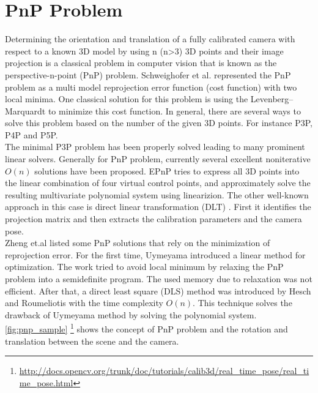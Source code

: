 \section{PnP Problem} \label{sec:PnP_problem}
Determining the orientation and translation of a fully calibrated camera with respect to a known 3D model by using n (n>3) 3D points and their image projection is a classical problem in computer vision that is known as the perspective-n-point (PnP) problem. Schweighofer et al. \cite{schweighofer2006robust} represented the PnP problem as a multi model reprojection error function (cost function) with two local minima. One classical solution for this problem is using the Levenberg–Marquardt to minimize this cost function. In general, there are several ways to solve this problem based on the number of the given 3D points. For instance P3P, P4P and P5P. \\
The minimal P3P problem has been properly solved leading to many prominent linear solvers. Generally for PnP problem, currently several excellent noniterative $O(n)$ solutions have been proposed. EPnP \cite{lepetit2009epnp} tries to express all 3D points into the linear combination of four virtual control points, and approximately solve the resulting multivariate polynomial system using linearizion. The other well-known approach in this case is direct linear transformation (DLT) \cite{hartley2003multiple}. First it identifies the projection matrix and then extracts the calibration parameters and the camera pose. \\
Zheng et.al \cite{zheng2013revisiting} listed some PnP solutions that rely on the minimization of reprojection error. For the first time, Uymeyama \cite{umeyama1991least} introduced a linear method for optimization. The work tried to avoid local minimum by relaxing the PnP problem into a semidefinite program. The used memory due to relaxation was not efficient. After that, a direct least square (DLS) method was introduced by Hesch and Roumeliotis \cite{hesch2011direct} with the time complexity $O(n)$. This technique solves the drawback of Uymeyama method by solving the polynomial system.\\
\autoref{fig:pnp_sample} \footnote{\url{http://docs.opencv.org/trunk/doc/tutorials/calib3d/real_time_pose/real_time_pose.html}} shows the concept of PnP problem and the rotation and translation between the scene and the camera.

